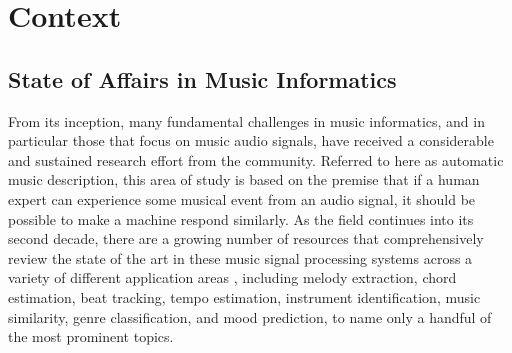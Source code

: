 

\graphicspath{{2/figures/}}

\chapter{Context}
\label{chp:context}



\section{State of Affairs in Music Informatics}


From its inception, many fundamental challenges in music informatics, and in particular those that focus on music audio signals, have received a considerable and sustained research effort from the community.
Referred to here as automatic music description, this area of study is based on the premise that if a human expert can experience some musical event from an audio signal, it should be possible to make a machine respond similarly.
As the field continues into its second decade, there are a growing number of resources that comprehensively review the state of the art in these music signal processing systems across a variety of different application areas  \cite{Klapuri2006,Casey2008,Mueller2011a}, including melody extraction, chord estimation, beat tracking, tempo estimation, instrument identification, music similarity, genre classification, and mood prediction, to name only a handful of the most prominent topics.

